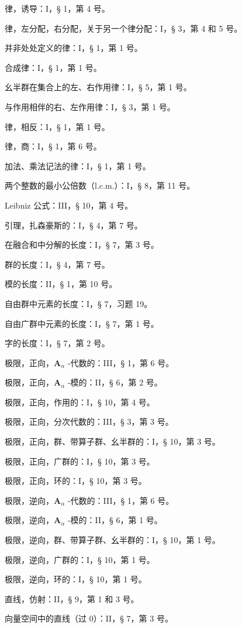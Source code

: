 律，诱导：I，§ 1，第 4 号。

律，左分配，右分配，关于另一个律分配：I，§ 3，第 4 和 5 号。

并非处处定义的律：I，§ 1，第 1 号。

合成律：I，§ 1，第 1 号。

幺半群在集合上的左、右作用律：I，§ 5，第 1 号。

与作用相伴的右、左作用律：I，§ 3，第 1 号。

律，相反：I，§ 1，第 1 号。

律，商：I，§ 1，第 6 号。

加法、乘法记法的律：I，§ 1，第 1 号。

两个整数的最小公倍数（l.c.m.）：I，§ 8，第 11 号。

Leibniz 公式：III，§ 10，第 4 号。

引理，扎森豪斯的：I，§ 4，第 7 号。

在融合和中分解的长度：I，§ 7，第 3 号。

群的长度：I，§ 4，第 7 号。

模的长度：II，§ 1，第 10 号。

自由群中元素的长度：I，§ 7，习题 19。

自由广群中元素的长度：I，§ 7，第 1 号。

字的长度：I，§ 7，第 2 号。

极限，正向，\(\mathbf{A}_{\alpha}\) -代数的：III，§ 1，第 6 号。

极限，正向，\(\mathbf{A}_{\alpha}\) -模的：II，§ 6，第 2 号。

极限，正向，作用的：I，§ 10，第 4 号。

极限，正向，分次代数的：III，§ 3，第 3 号。

极限，正向，群、带算子群、幺半群的：I，§ 10，第 3 号。

极限，正向，广群的：I，§ 10，第 3 号。

极限，正向，环的：I，§ 10，第 3 号。

极限，逆向，\(\mathbf{A}_{\alpha}\) -代数的：III，§ 1，第 6 号。

极限，逆向，\(\mathbf{A}_{\alpha}\) -模的：II，§ 6，第 1 号。

极限，逆向，群、带算子群、幺半群的：I，§ 10，第 1 号。

极限，逆向，广群的：I，§ 10，第 1 号。

极限，逆向，环的：I，§ 10，第 1 号。

直线，仿射：II，§ 9，第 1 和 3 号。

向量空间中的直线（过 0）：II，§ 7，第 3 号。


